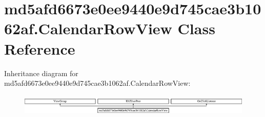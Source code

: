 \hypertarget{classmd5afd6673e0ee9440e9d745cae3b1062af_1_1CalendarRowView}{}\section{md5afd6673e0ee9440e9d745cae3b1062af.\+Calendar\+Row\+View Class Reference}
\label{classmd5afd6673e0ee9440e9d745cae3b1062af_1_1CalendarRowView}
Inheritance diagram for md5afd6673e0ee9440e9d745cae3b1062af.\+Calendar\+Row\+View\+:\begin{figure}[H]
\begin{center}
\leavevmode
\includegraphics[height=1.011743cm]{classmd5afd6673e0ee9440e9d745cae3b1062af_1_1CalendarRowView}
\end{center}
\end{figure}

